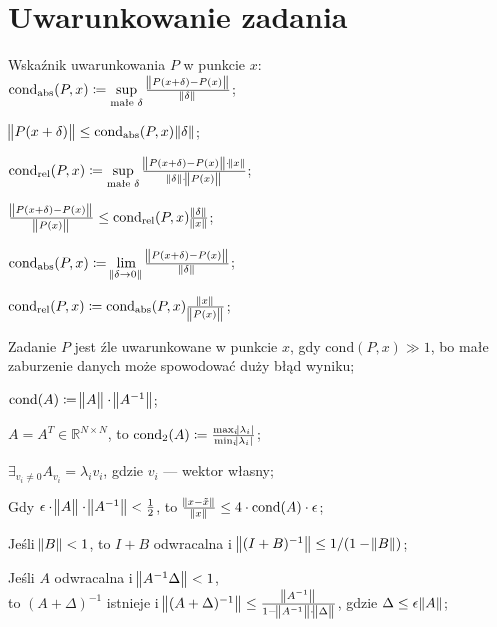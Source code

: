 \section{Uwarunkowanie zadania}

\entry
Wskaźnik uwarunkowania $P$ w punkcie $x$:\\ $\mathrm{cond}_{\mathrm{abs}}(P,x) \coloneqq \sup\limits_{\text{małe }\delta} \frac{\norm{P(x+\delta) - P(x)}}{\norm{\delta}}$;

\entry
$\norm{P(x+\delta)} \leq \mathrm{cond}_{\mathrm{abs}}(P,x)\norm{\delta}$;

\entry
$\mathrm{cond}_{\mathrm{rel}}(P,x) \coloneqq \sup\limits_{\text{małe }\delta} \frac{\norm{P(x+\delta) - P(x)} \cdot \norm{x}}{\norm{\delta} \cdot \norm{P(x)}}$;

\entry
$\frac{\norm{P(x+\delta) - P(x)}}{\norm{P(x)}} \leq \mathrm{cond}_{\mathrm{rel}}(P,x)\frac{\norm{\delta}}{\norm{x}}$;


\entry
$\mathrm{cond}_{\mathrm{abs}}(P,x) \coloneqq \lim\limits_{\norm{\delta \to 0}} \frac{\norm{P(x+\delta) - P(x)}}{\norm{\delta}}$;

\entry
$\mathrm{cond}_{\mathrm{rel}}(P,x) \coloneqq \mathrm{cond}_{\mathrm{abs}}(P,x)\frac{\norm{x}}{\norm{P(x)}} $;

\entry
Zadanie $P$ jest źle uwarunkowane w punkcie $x$, gdy $\mathrm{cond}(P,x) \gg 1$, bo małe zaburzenie danych może spowodować duży błąd wyniku;

\entry
$\mathrm{cond}(A) \coloneqq \norm{\vphantom{A^{-1}}A}\cdot\norm{A^{-1}}$;

\entry
$A=A^T\in\mathbb{R}^{N\times N}$, to $\mathrm{cond}_2(A)\coloneqq \frac{\max_i\abs{\lambda_i}}{\min_i\abs{\lambda_i}}$;

\entry
$\exists_{v_i\neq 0} A_{v_i} = \lambda_i v_i$, gdzie $v_i$ --- wektor własny;

\entry
Gdy $\epsilon\cdot\norm{\vphantom{A^1}A}\cdot\norm{A^{-1}} < \frac{1}{2}$, to $\frac{\norm{x - \tilde{x}}}{\norm{x}} \leq 4 \cdot \mathrm{cond}(A) \cdot \epsilon$;

\entry
Jeśli $\norm{B} < 1$, to $I+B$ odwracalna i $\norm{(I+B)^{-1}} \leq 1 / (1 - \norm{B})$;

\entry
Jeśli $A$ odwracalna i $\norm{A^{-1}\Delta} < 1$,\\ to $(A+\Delta)^{-1}$ istnieje i $\norm{(A+\Delta)^{-1}} \leq \frac{\norm{A^{-1}}}{1 - \norm{A^{-1}} \cdot \norm{\vphantom{A^1}\Delta}}$, gdzie $\Delta \leq \epsilon\norm{A}$;

